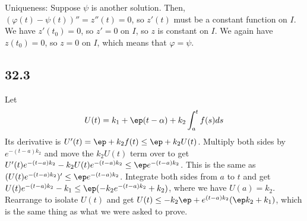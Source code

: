 \documentclass{article}
\begin{document}
Uniqueness: Suppose $\psi$ is another solution. Then, $(\varphi(t)-\psi(t))''=z''(t)=0$, so $z'(t)$ must be a constant function on $I$. We have $z'(t_0)=0$, so $z'=0$ on $I$, so $z$ is constant on $I$. We again have $z(t_0)=0$, so $z=0$ on $I$, which means that $\varphi=\psi$.
\subsection*{32.3}
Let $$U(t)=k_1+\ep(t-\alpha)+k_2\int_a^tf(s)ds$$ Its derivative is $U'(t)=\ep+k_2f(t)\leq\ep+k_2U(t)$. Multiply both sides by $e^{-(t-a)k_2}$ and move the $k_2U(t)$ term over to get $U'(t)e^{-(t-a)k_2}-k_2U(t)e^{-(t-a)k_2}\leq\ep e^{-(t-a)k_2}$. This is the same as $(U(t)e^{-(t-a)k_2})'\leq\ep e^{-(t-a)k_2}$. Integrate both sides from $a$ to $t$ and get $U(t)e^{-(t-a)k_2}-k_1\leq\ep(-k_2e^{-(t-a)k_2}+k_2)$, where we have $U(a)=k_2$. Rearrange to isolate $U(t)$ and get $U(t)\leq-k_2\ep+e^{(t-a)k_2}(\ep k_2+k_1)$, which is the same thing as what we were asked to prove.
\end{document}
